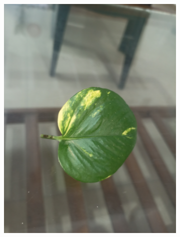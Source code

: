 \documentclass[twocolumn]{article}
\begin{document}
\begin{figure}[H]
    \centering
    \begin{subfigure}[b]{0.30\columnwidth}
        \includegraphics[width=\textwidth]{money1}
    \end{subfigure}
    \hfill
    \begin{subfigure}[b]{0.30\columnwidth}

\end{subfigure}
\end{figure}
\end{document}
